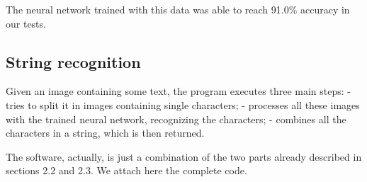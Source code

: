 \documentclass[11pt]{article}
\begin{document}
    The neural network trained with this data was able to reach 91.0\%
accuracy in our tests.

    \hypertarget{string-recognition}{%
\subsection{String recognition}\label{string-recognition}}

Given an image containing some text, the program executes three main
steps: - tries to split it in images containing single characters; -
processes all these images with the trained neural network, recognizing
the characters; - combines all the characters in a string, which is then
returned.

The software, actually, is just a combination of the two parts already
described in sections 2.2 and 2.3. We attach here the complete code.
\end{document}
